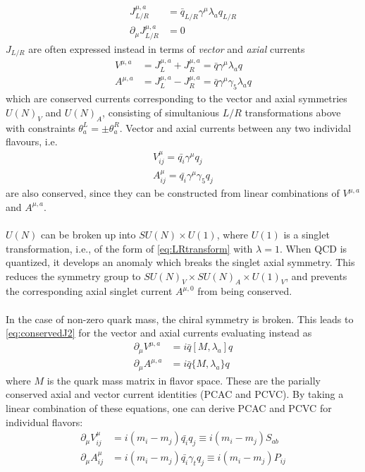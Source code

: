 \begin{align}
	J_{L/R}^{\mu,a} &= \bar{q}_{L/R} \gamma^{\mu} \lambda_a q_{L/R} \\
	\partial_{\mu} J_{L/R}^{\mu,a} &= 0
\end{align}
$J_{L/R}$ are often expressed instead in terms of {\it{vector}} and {\it{axial}} currents
\begin{align}
	V^{\mu,a} &= J^{\mu,a}_L + J^{\mu,a}_R = \bar{q} \gamma^{\mu} \lambda_a q \\
	A^{\mu,a} &= J^{\mu,a}_L - J^{\mu,a}_R = \bar{q} \gamma^{\mu} \gamma_5 \lambda_a q
\end{align}
which are conserved currents corresponding to the vector and axial symmetries $U(N)_V$ and $U(N)_A$, consisting of simultanious $L/R$ transformations above with constraints $\theta_a^{L} = \pm \theta_a^{R}$. Vector and axial currents between any two individal flavours, i.e.
\begin{align}
	\label{eq:individualflavs1}
	V^{\mu}_{ij} = \bar{q_i} \gamma^{\mu} q_j \\
	A^{\mu}_{ij} = \bar{q_i} \gamma^{\mu} \gamma_5 q_j
	\label{eq:individualflavs2}
\end{align}
are also conserved, since they can be constructed from linear combinations of $V^{\mu,a}$ and $A^{\mu,a}$.
\\ \\
$U(N)$ can be broken up into $SU(N)\times U(1)$, where $U(1)$ is a singlet transformation, i.e., of the form of \eqref{eq:LRtransform} with $\lambda = 1$. When QCD is quantized, it develops an anomaly which breaks the singlet axial symmetry. This reduces the symmetry group to $SU(N)_V\times SU(N)_A\times U(1)_V$, and prevents the corresponding axial singlet current $A^{\mu,0}$ from being conserved.
\\ \\
In the case of non-zero quark mass, the chiral symmetry is broken. This leads to \eqref{eq:conservedJ2} for the vector and axial currents evaluating instead as
\begin{align}
	\partial_{\mu} V^{\mu,a} &= i\bar{q} [ M,  \lambda_a ] q \\
	\partial_{\mu} A^{\mu,a} &= i\bar{q} \{ M, \lambda_a \} q 
\end{align}
where $M$ is the quark mass matrix in flavor space. These are the parially conserved axial and vector current identities (PCAC and PCVC). By taking a linear combination of these equations, one can derive PCAC and PCVC for individual flavors:
\begin{align}
	\partial_{\mu} V_{ij}^{\mu} &= i(m_i - m_j) \bar{q_i} q_j \equiv i(m_i - m_j) S_{ab} \\
	\partial_{\mu} A_{ij}^{\mu} &= i(m_i - m_j) \bar{q_i} \gamma_t q_j \equiv i(m_i - m_j) P_{ij}
\end{align}
